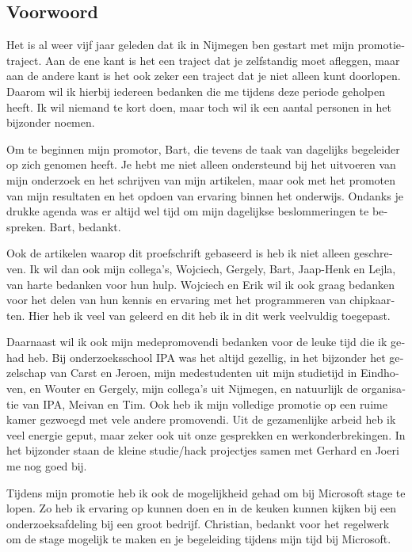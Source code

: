 \begin{otherlanguage}{dutch}

\chapter*{Voorwoord}

Het is al weer vijf jaar geleden dat ik in Nijmegen ben gestart met mijn 
promotietraject. Aan de ene kant is het een traject dat je zelfstandig moet 
afleggen, maar aan de andere kant is het ook zeker een traject dat je niet
alleen kunt doorlopen. Daarom wil ik hierbij iedereen bedanken die me tijdens 
deze periode geholpen heeft. Ik wil niemand te kort doen, maar toch wil ik een
aantal personen in het bijzonder noemen.

Om te beginnen mijn promotor, Bart, die tevens de taak van dagelijks begeleider 
op zich genomen heeft. Je hebt me niet alleen ondersteund bij het uitvoeren van 
mijn onderzoek en het schrijven van mijn artikelen, maar ook met het promoten 
van mijn resultaten en het opdoen van ervaring binnen het onderwijs. Ondanks je
drukke agenda was er altijd wel tijd om mijn dagelijkse beslommeringen te 
bespreken. Bart, bedankt.

Ook de artikelen waarop dit proefschrift gebaseerd is heb ik niet alleen 
geschreven. Ik wil dan ook mijn collega's, Wojciech, Gergely, Bart, Jaap-Henk
en Lejla, van harte bedanken voor hun hulp. Wojciech en Erik wil ik ook graag 
bedanken voor het delen van hun kennis en ervaring met het programmeren van 
chipkaarten. Hier heb ik veel van geleerd en dit heb ik in dit werk veelvuldig 
toegepast.

Daarnaast wil ik ook mijn medepromovendi bedanken voor de leuke tijd die ik 
gehad heb. Bij onderzoeksschool IPA was het altijd gezellig, in het bijzonder 
het gezelschap van Carst en Jeroen, mijn medestudenten uit mijn studietijd in 
Eindhoven, en Wouter en Gergely, mijn collega's uit Nijmegen, en natuurlijk de 
organisatie van IPA, Meivan en Tim. Ook heb ik mijn volledige promotie op een 
ruime kamer gezwoegd met vele andere promovendi. Uit de gezamenlijke arbeid heb
ik veel energie geput, maar zeker ook uit onze gesprekken en werkonderbrekingen.
In het bijzonder staan de kleine studie/hack projectjes samen met Gerhard 
en Joeri me nog goed bij.

Tijdens mijn promotie heb ik ook de mogelijkheid gehad om bij Microsoft stage 
te lopen. Zo heb ik ervaring op kunnen doen en in de keuken kunnen kijken bij 
een onderzoeksafdeling bij een groot bedrijf. Christian, bedankt voor het
regelwerk om de stage mogelijk te maken en je begeleiding tijdens mijn tijd bij
Microsoft.


\end{otherlanguage}
